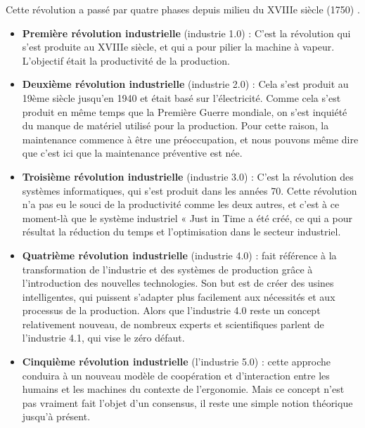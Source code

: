     Cette révolution a passé par quatre phases depuis milieu du XVIIIe siècle (1750) \cite{RevolutionsIndustriellesIndustrie}.
\begin{itemize}
    \item \textbf{Première révolution industrielle}  (industrie 1.0) : C'est la révolution qui s'est produite au XVIIIe siècle, et qui a pour pilier la machine à vapeur. L'objectif était la productivité de la production. 
 
    \item \textbf{Deuxième révolution industrielle} (industrie 2.0) : Cela s'est produit au 19ème siècle jusqu'en 1940 et était basé sur l'électricité. Comme cela s'est produit en même temps que la Première Guerre mondiale, on s'est inquiété du manque de matériel utilisé pour la production. Pour cette raison, la maintenance commence à être une préoccupation, et nous pouvons même dire que c'est ici que la maintenance préventive est née. 
     
    \item \textbf{Troisième révolution industrielle} (industrie 3.0) :  C'est la révolution des systèmes informatiques, qui s'est produit dans les années 70. Cette révolution n'a pas eu le souci de la productivité comme les deux autres, et c'est à ce moment-là que le système industriel « Just in Time a été créé, ce qui a pour résultat la réduction du temps et l'optimisation dans le secteur industriel. 
     
    \item \textbf{Quatrième révolution industrielle} (industrie 4.0) : fait référence à la transformation de l’industrie et des systèmes de production grâce à l’introduction des nouvelles technologies. Son but est de créer des usines intelligentes, qui puissent s’adapter plus facilement aux nécessités et aux processus de la production. Alors que l'industrie 4.0 reste un concept relativement nouveau, de nombreux experts et scientifiques parlent de l'industrie 4.1, qui vise le zéro défaut\cite{chengIndustryIntelligentManufacturing2021}. 
     
    \item \textbf{Cinquième révolution industrielle} (l'industrie 5.0) : cette approche conduira à un nouveau modèle de coopération et d'interaction entre les humains et les machines du contexte de l’ergonomie. Mais ce concept n'est pas vraiment fait l'objet d'un consensus, il reste une simple notion théorique jusqu'à présent.\cite{IndustrieVaInduire2018}
\end{itemize}


